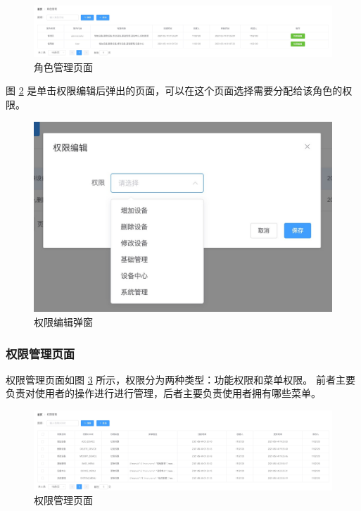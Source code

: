 \begin{figure}[ht]
    \centering
    \includegraphics[width=1\linewidth]{./Figure/IMG_role.png}
    \caption{角色管理页面}\label{Fig:role}
\end{figure}

图 \ref{Fig:add_permission} 是单击权限编辑后弹出的页面，可以在这个页面选择需要分配给该角色的权限。

\begin{figure}[ht]
    \centering
    \includegraphics[width=.8\linewidth]{./Figure/IMG_add_permission.png}
    \caption{权限编辑弹窗}\label{Fig:add_permission}
\end{figure}

\subsubsection{权限管理页面}

权限管理页面如图 \ref{Fig:permission} 所示，权限分为两种类型：功能权限和菜单权限。
前者主要负责对使用者的操作进行进行管理，后者主要负责使用者拥有哪些菜单。

\begin{figure}[ht]
    \centering
    \includegraphics[width=1\linewidth]{./Figure/IMG_permission.png}
    \caption{权限管理页面}\label{Fig:permission}
\end{figure}

